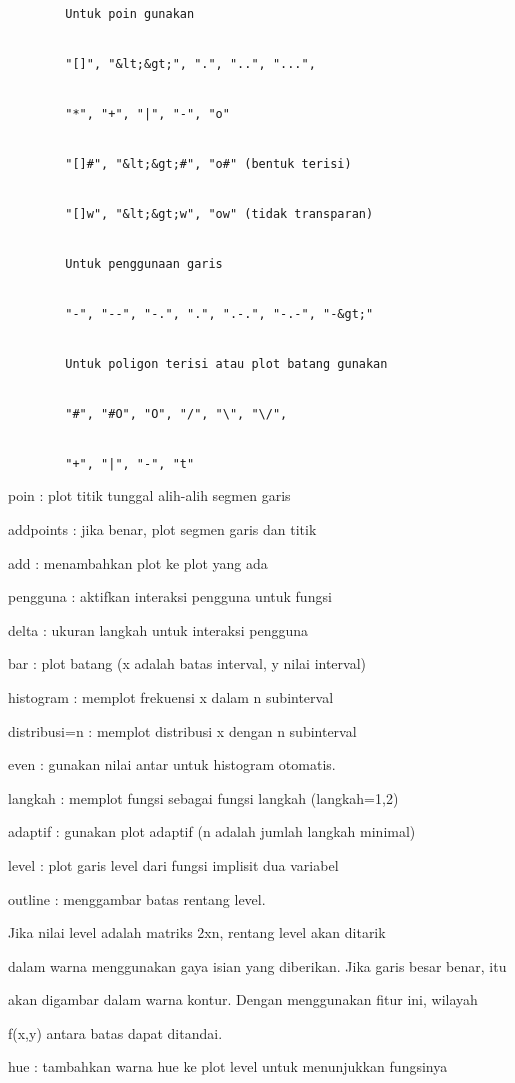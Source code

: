 \documentclass[
]{book}
\begin{document}
\begin{verbatim}
        Untuk poin gunakan


        "[]", "&lt;&gt;", ".", "..", "...",


        "*", "+", "|", "-", "o"


        "[]#", "&lt;&gt;#", "o#" (bentuk terisi)


        "[]w", "&lt;&gt;w", "ow" (tidak transparan)


        Untuk penggunaan garis


        "-", "--", "-.", ".", ".-.", "-.-", "-&gt;"


        Untuk poligon terisi atau plot batang gunakan


        "#", "#O", "O", "/", "\", "\/",


        "+", "|", "-", "t"
\end{verbatim}

poin : plot titik tunggal alih-alih segmen garis

addpoints : jika benar, plot segmen garis dan titik

add : menambahkan plot ke plot yang ada

pengguna : aktifkan interaksi pengguna untuk fungsi

delta : ukuran langkah untuk interaksi pengguna

bar : plot batang (x adalah batas interval, y nilai interval)

histogram : memplot frekuensi x dalam n subinterval

distribusi=n : memplot distribusi x dengan n subinterval

even : gunakan nilai antar untuk histogram otomatis.

langkah : memplot fungsi sebagai fungsi langkah (langkah=1,2)

adaptif : gunakan plot adaptif (n adalah jumlah langkah minimal)

level : plot garis level dari fungsi implisit dua variabel

outline : menggambar batas rentang level.

Jika nilai level adalah matriks 2xn, rentang level akan ditarik

dalam warna menggunakan gaya isian yang diberikan. Jika garis besar benar, itu

akan digambar dalam warna kontur. Dengan menggunakan fitur ini, wilayah

f(x,y) antara batas dapat ditandai.

hue : tambahkan warna hue ke plot level untuk menunjukkan fungsinya
\end{document}
